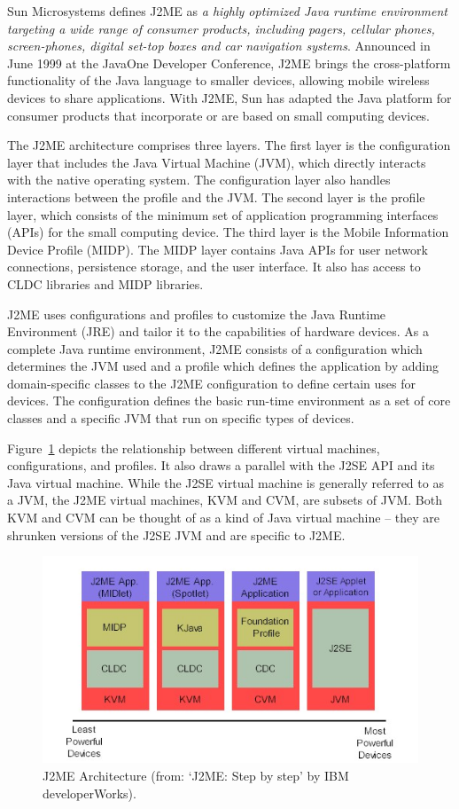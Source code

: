 \bigskip%
Sun Microsystems defines J2ME as \emph{a highly optimized Java runtime environment targeting
a wide range of consumer products, including pagers, cellular phones, screen-phones,
digital set-top boxes and car navigation systems}.
Announced in June 1999 at the JavaOne Developer Conference, J2ME brings the
cross-platform functionality of the Java language to smaller devices, allowing mobile
wireless devices to share applications. With J2ME, Sun has adapted the Java platform for
consumer products that incorporate or are based on small computing devices.

The J2ME architecture comprises three layers. The first layer
is the configuration layer that includes the Java Virtual Machine (JVM), which directly
interacts with the native operating system. The configuration layer also handles interactions
between the profile and the JVM. The second layer is the profile layer, which
consists of the minimum set of application programming interfaces (APIs) for the small
computing device. The third layer is the Mobile Information Device Profile (MIDP).
The MIDP layer contains Java APIs for user network connections, persistence storage,
and the user interface. It also has access to CLDC libraries and MIDP libraries.

J2ME uses configurations and profiles to customize the Java Runtime Environment (JRE) 
and tailor it to the capabilities of hardware devices.
As a complete Java runtime environment, J2ME consists of a configuration which determines the JVM used 
and a profile which defines the application by adding domain-specific classes to the J2ME
configuration to define certain uses for devices. The configuration defines the basic
run-time environment as a set of core classes and a specific JVM that run on specific types
of devices.

Figure~\ref{fig:j2mearchitecture} depicts the relationship between different virtual machines,
configurations, and profiles. It also draws a parallel with the J2SE API and its Java virtual
machine. While the J2SE virtual machine is generally referred to as a JVM, the J2ME virtual
machines, KVM and CVM, are subsets of JVM. Both KVM and CVM can be thought of as a
kind of Java virtual machine -- they are shrunken versions of the J2SE JVM and
are specific to J2ME.

\begin{figure}[t]%
\begin{center}
\includegraphics[width=.8\linewidth]{figures/j2me-architecture}
\end{center}
\caption{J2ME Architecture (from: `J2ME: Step by step' by IBM developerWorks).}%
\label{fig:j2mearchitecture}
\end{figure}

